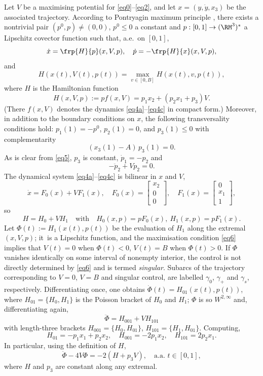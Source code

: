 Let $V$ be a maximising potential for \eqref{eq0}--\eqref{eq2},
and let $x=(y,\dot{y},x_3)$ be the associated trajectory.
According to Pontryagin maximum principle \cite{agrachev-2004a},
there exists a nontrivial pair $(p^0,p) \neq (0,0)$, $p^0 \leq 0$ a constant and
$p:[0,1] \to (\RM^3)^*$ a Lipschitz covector function such that, a.e.\ on $[0,1]$,
\begin{equation} \label{eq5}
\dot{x}=\frp{H}{p}(x,V,p),\quad \dot{p}=-\frp{H}{x}(x,V,p),
\end{equation}
and
\begin{equation} \label{eq6}
H(x(t),V(t),p(t)) = \max_{v \in [0,B]} H(x(t),v,p(t)),
\end{equation}
where $H$ is the Hamiltonian function
\[
H(x,V,p) := pf(x,V)= p_1x_2 + (p_2x_1+p_3)V.
\]
(There $f(x,V)$ denotes the dynamics \eqref{eq4a}--\eqref{eq4c} in compact form.)
Moreover, in addition to the boundary conditions on $x$, the following transversality
conditions hold: $p_1(1)=-p^0$, $p_2(1)=0$, and $p_3(1) \leq 0$ with complementarity
\[
(x_3(1)-A)\,p_3(1) = 0.
\]
As is clear from \eqref{eq5}, $p_3$ is constant, $\dot{p}_1=-p_2$ and
\begin{equation} \label{eq7}
-\ddot{p}_2+Vp_2 = 0.
\end{equation}
The dynamical system \eqref{eq4a}--\eqref{eq4c} is bilinear in $x$ and $V$,
\[
\dot{x} = F_0(x)+VF_1(x),\quad
F_0(x) = \begin{bmatrix} x_2\\ 0\\ 0 \end{bmatrix},\quad
F_1(x) = \begin{bmatrix} 0\\ x_1\\ 1 \end{bmatrix},
\]
so
\[
H=H_0+VH_1\quad \text{with}\quad H_0(x,p)=pF_0(x),\ H_1(x,p)=pF_1(x).
\]
Let $\Phi(t):=H_1(x(t),p(t))$ be the evaluation of $H_1$ along the extremal $(x,V,p)$;
it~is a Lipschitz function, and
the maximisation condition \eqref{eq6} implies that $V(t)=0$ when $\Phi(t)<0$,
$V(t)=B$ when $\Phi(t)>0$. If $\Phi$ vanishes identically on some interval of nonempty
interior, the control is not directly determined by \eqref{eq6} and is termed
\emph{singular}. Subarcs of the trajectory corresponding to $V=0$, $V=B$ and singular control,
are labelled $\gamma_0$, $\gamma_+$ and $\gamma_s$, respectively. Differentiating
once, one obtains $\dot{\Phi}(t)=H_{01}(x(t),p(t))$,
where $H_{01}=\{H_0,H_1\}$ is the Poisson
bracket of $H_0$ and $H_1$; $\Phi$ is so $W^{2,\infty}$ and, differentiating again,
\begin{equation} \label{eq8}
\ddot{\Phi} = H_{001}+V H_{101}
\end{equation}
with length-three brackets $H_{001}=\{H_0,H_{01}\}$, $H_{101}=\{H_1,H_{01}\}$.
Computing,
\[
H_{01}=-p_1x_1+p_2x_2,\quad H_{001}=-2p_1x_2,\quad H_{101}= 2p_2x_1.
\]
In particular, using the definition of $H$,
\begin{equation} \label{eq9}
\ddot{\Phi}-4V\Phi =-2(H+p_3 V),\quad \text{a.a.\ }t \in [0,1],
\end{equation}
where $H$ and $p_3$ are constant along any extremal.

